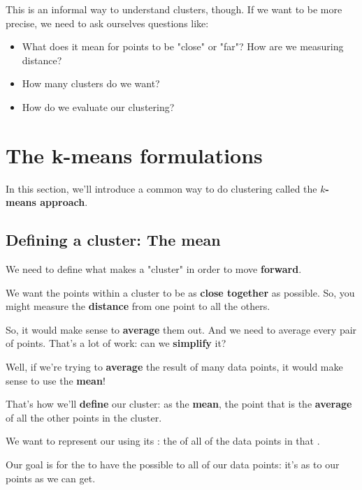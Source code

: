         This is an informal way to understand clusters, though. If we want to be more precise, we need to ask ourselves questions like:
        
        \begin{itemize}
            \item What does it mean for points to be "close" or "far"? How are we measuring distance?
            
            \item How many clusters do we want?
            
            \item How do we evaluate our clustering?
        \end{itemize}
        
\pagebreak

\section{The k-means formulations}

    In this section, we'll introduce a common way to do clustering called the \textbf{$k$-means approach}.

    \subsection{Defining a cluster: The mean}
        
        We need to define what makes a "cluster" in order to move \textbf{forward}.
        
        We want the points within a cluster to be as \textbf{close together} as possible. So, you might measure the \textbf{distance} from one point to all the others.
        
        So, it would make sense to \textbf{average} them out. And we need to average every pair of points. That's a lot of work: can we \textbf{simplify} it?
        
        Well, if we're trying to \textbf{average} the result of many data points, it would make sense to use the \textbf{mean}!
        
        That's how we'll \textbf{define} our cluster: as the \textbf{mean}, the point that is the \textbf{average} of all the other points in the cluster.\\
        
        \begin{definition}
            We want to represent our  using its : the  of all of the data points in that .
             
            Our goal is for the  to have the  possible to all of our data points: it's as  to our points as we can get.
        \end{definition}
        
